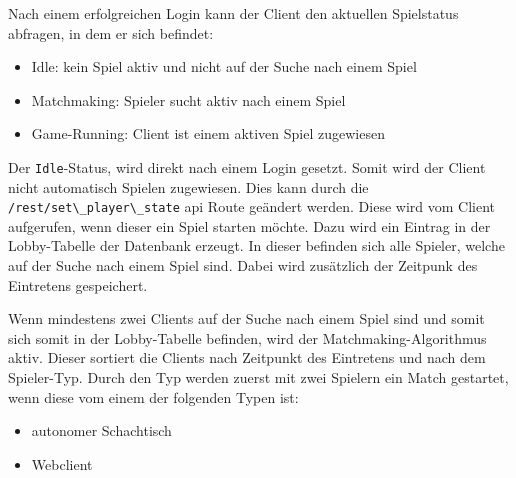 Nach einem erfolgreichen Login kann der Client den aktuellen Spielstatus
abfragen, in dem er sich befindet:

\begin{itemize}
\tightlist
\item
  Idle: kein Spiel aktiv und nicht auf der Suche nach einem Spiel
\item
  Matchmaking: Spieler sucht aktiv nach einem Spiel
\item
  Game-Running: Client ist einem aktiven Spiel zugewiesen
\end{itemize}

Der \passthrough{\lstinline!Idle!}-Status, wird direkt nach einem Login
gesetzt. Somit wird der Client nicht automatisch Spielen zugewiesen.
Dies kann durch die \passthrough{\lstinline!/rest/set\_player\_state!}
\gls{api} Route geändert werden. Diese wird vom Client aufgerufen, wenn
dieser ein Spiel starten möchte. Dazu wird ein Eintrag in der
Lobby-Tabelle der Datenbank erzeugt. In dieser befinden sich alle
Spieler, welche auf der Suche nach einem Spiel sind. Dabei wird
zusätzlich der Zeitpunk des Eintretens gespeichert.

Wenn mindestens zwei Clients auf der Suche nach einem Spiel sind und
somit sich somit in der Lobby-Tabelle befinden, wird der
Matchmaking-Algorithmus aktiv. Dieser sortiert die Clients nach
Zeitpunkt des Eintretens und nach dem Spieler-Typ. Durch den Typ werden
zuerst mit zwei Spielern ein Match gestartet, wenn diese vom einem der
folgenden Typen ist:

\begin{itemize}
\tightlist
\item
  autonomer Schachtisch
\item
  Webclient
\end{itemize}

